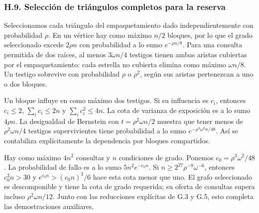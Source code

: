\documentclass[spanish,11pt,a4paper]{article}
\begin{document}
\subsubsection{H.9. Selección de triángulos completos para la reserva}\label{h.9.-selecciuxf3n-de-triuxe1ngulos-completos-para-la-reserva}

Seleccionamos cada triángulo del empaquetamiento dado independientemente con probabilidad \(\rho\). En un vértice hay como máximo \(n/2\) bloques, por lo que el grado seleccionado excede \(2\rho n\) con probabilidad a lo sumo \(e^{-\rho n/8}\). Para una consulta permitida de dos raíces, al menos \(3\omega n/4\) testigos tienen ambas aristas cubiertas por el empaquetamiento: cada estrella no cubierta elimina como máximo \(\omega n/8\). Un testigo sobrevive con probabilidad \(\rho\) o \(\rho^2\), según sus aristas pertenezcan a uno o dos bloques.

Un bloque influye en como máximo dos testigos. Si su influencia es \(c_i\), entonces \(c_i\le2\), \(\sum_i c_i\le2n\) y \(\sum_i c_i^2\le4n\). La cota de varianza de exposición es a lo sumo \(4\rho n\). La desigualdad de Bernstein con \(t=\rho^2\omega n/2\) muestra que tener menos de \(\rho^2\omega n/4\) testigos supervivientes tiene probabilidad a lo sumo \(e^{-\rho^3\omega^2n/48}\). Así se contabiliza explícitamente la dependencia por bloques compartidos.

Hay como máximo \(4n^2\) consultas y \(n\) condiciones de grado. Ponemos \(c_0=\rho^3\omega^2/48\). La probabilidad de fallo es a lo sumo \(5n^2e^{-c_0n}\). Si \(n\ge2^{27}\rho^{-9}\omega^{-6}\), entonces \(c_0^3n>30\) y \(e^{c_0n}>(c_0n)^3/6\) hace esta cota menor que uno. El grafo seleccionado es descomponible y tiene la cota de grado requerida; su oferta de consultas supera incluso \(\rho^2\omega n/12\). Junto con las reducciones explícitas de G.3 y G.5, esto completa las demostraciones auxiliares.
\end{document}
